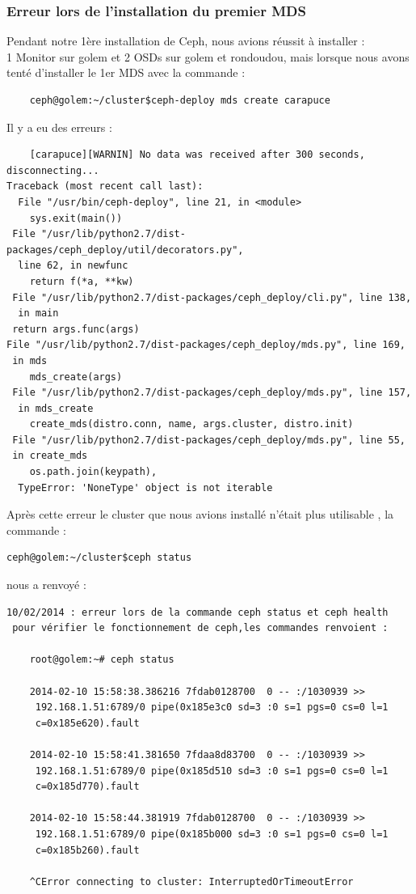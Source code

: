\documentclass[12pt]{article}
\begin{document}
	\subsubsection{Erreur lors de l'installation du premier MDS}
	Pendant notre 1ère installation de Ceph, nous avions réussit à installer :
	\\ 1 Monitor sur golem et 2 OSDs sur golem et rondoudou, mais lorsque nous avons tenté d'installer le 1er MDS avec la commande :
	\begin{verbatim}
	ceph@golem:~/cluster$ceph-deploy mds create carapuce
	\end{verbatim}
	
	Il y a eu des erreurs :
	\begin{verbatim}
	[carapuce][WARNIN] No data was received after 300 seconds, disconnecting...
Traceback (most recent call last):
  File "/usr/bin/ceph-deploy", line 21, in <module>
    sys.exit(main())
 File "/usr/lib/python2.7/dist-packages/ceph_deploy/util/decorators.py",
  line 62, in newfunc
    return f(*a, **kw)
 File "/usr/lib/python2.7/dist-packages/ceph_deploy/cli.py", line 138,
  in main
 return args.func(args)
File "/usr/lib/python2.7/dist-packages/ceph_deploy/mds.py", line 169,
 in mds
    mds_create(args)
 File "/usr/lib/python2.7/dist-packages/ceph_deploy/mds.py", line 157,
  in mds_create
    create_mds(distro.conn, name, args.cluster, distro.init)
 File "/usr/lib/python2.7/dist-packages/ceph_deploy/mds.py", line 55, 
 in create_mds
    os.path.join(keypath),
  TypeError: 'NoneType' object is not iterable 
	\end{verbatim}

Après cette erreur le cluster que nous avions installé n’était plus utilisable , la commande :
\begin{verbatim}
ceph@golem:~/cluster$ceph status
\end{verbatim}
nous a renvoyé :
\begin{verbatim}
10/02/2014 : erreur lors de la commande ceph status et ceph health
 pour vérifier le fonctionnement de ceph,les commandes renvoient :

    root@golem:~# ceph status

    2014-02-10 15:58:38.386216 7fdab0128700  0 -- :/1030939 >>
     192.168.1.51:6789/0 pipe(0x185e3c0 sd=3 :0 s=1 pgs=0 cs=0 l=1 
     c=0x185e620).fault

    2014-02-10 15:58:41.381650 7fdaa8d83700  0 -- :/1030939 >>
     192.168.1.51:6789/0 pipe(0x185d510 sd=3 :0 s=1 pgs=0 cs=0 l=1 
     c=0x185d770).fault

    2014-02-10 15:58:44.381919 7fdab0128700  0 -- :/1030939 >>
     192.168.1.51:6789/0 pipe(0x185b000 sd=3 :0 s=1 pgs=0 cs=0 l=1 
     c=0x185b260).fault

    ^CError connecting to cluster: InterruptedOrTimeoutError
\end{verbatim}
\end{document}
